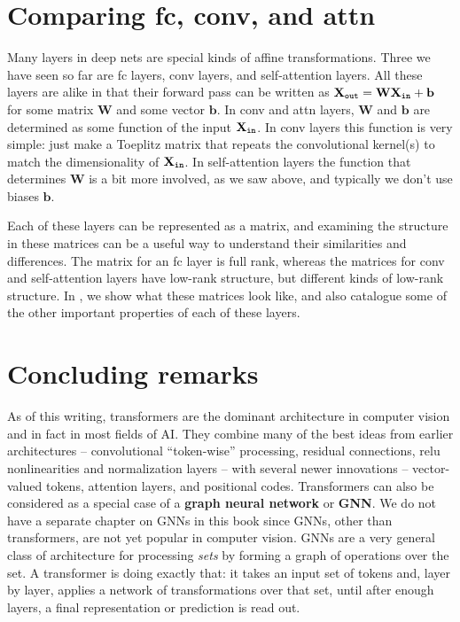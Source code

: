 \section{Comparing fc, conv, and attn}

Many layers in deep nets are special kinds of affine transformations. Three we have seen so far are fc layers, conv layers, and self-attention layers. All these layers are alike in that their forward pass can be written as $\mathbf{X}_{\texttt{out}} = \mathbf{W}\mathbf{X}_{\texttt{in}} + \mathbf{b}$ for some matrix $\mathbf{W}$ and some vector $\mathbf{b}$. In conv and attn layers, $\mathbf{W}$ and $\mathbf{b}$ are determined as some function of the input $\mathbf{X}_{\texttt{in}}$. In conv layers this function is very simple: just make a Toeplitz matrix that repeats the convolutional kernel(s) to match the dimensionality of $\mathbf{X}_{\texttt{in}}$. In self-attention layers the function that determines $\mathbf{W}$ is a bit more involved, as we saw above, and typically we don't use biases $\mathbf{b}$.

Each of these layers can be represented as a matrix, and examining the structure in these matrices can be a useful way to understand their similarities and differences. The matrix for an fc layer is full rank, whereas the matrices for conv and self-attention layers have low-rank structure, but different kinds of low-rank structure. In \fig{\ref{fig:transformers:affine_layer_comparison}}, we show what these matrices look like, and also catalogue some of the other important properties of each of these layers.


\section{Concluding remarks}
As of this writing, transformers are the dominant architecture in computer vision and in fact in most fields of AI. They combine many of the best ideas from earlier architectures -- convolutional ``token-wise'' processing, residual connections, relu nonlinearities and normalization layers -- with several newer innovations -- vector-valued tokens, attention layers, and positional codes. Transformers can also be considered as a special case of a \textbf{graph neural network} or \textbf{GNN}. We do not have a separate chapter on GNNs in this book since GNNs, other than transformers, are not yet popular in computer vision. GNNs are a very general class of architecture for processing \textit{sets} by forming a graph of operations over the set. A transformer is doing exactly that: it takes an input set of tokens and, layer by layer, applies a network of transformations over that set, until after enough layers, a final representation or prediction is read out.